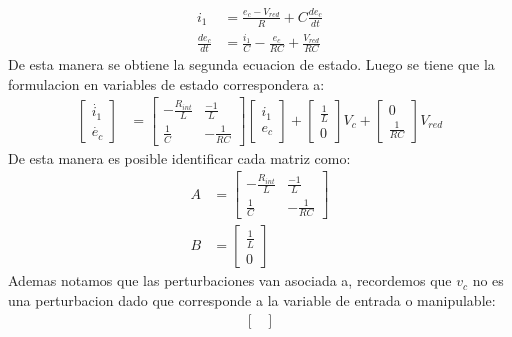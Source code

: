 \documentclass[
  11pt,
  letterpaper,
   addpoints,
   answers
  ]{exam}
\begin{document}
\begin{questions}
\begin{solution}
\begin{align}
        i_{1} &= \frac{e_{c} - V_{red}}{R} + C\frac{de_{c}}{dt}\\
        \frac{de_{c}}{dt} &= \frac{i_{1}}{C} - \frac{e_{c}}{RC}  + \frac{V_{red}}{RC}
    \end{align}
    De esta manera se obtiene la segunda ecuacion de estado. Luego se tiene que la formulacion en variables de estado correspondera a:
    \begin{align}
        \begin{bmatrix}
            \dot{i_{1}}\\
            \dot{e_{c}}
        \end{bmatrix}
        &=
        \begin{bmatrix}
            -\frac{R_{int}}{L} & \frac{-1}{L}\\
            \frac{1}{C} & -\frac{1}{RC}
        \end{bmatrix}
        \begin{bmatrix}
            i_{1}\\
            e_{c}
        \end{bmatrix}
        +
        \begin{bmatrix}
            \frac{1}{L}\\
            0
        \end{bmatrix}
        V_{c}
        +
        \begin{bmatrix}
            0\\
            \frac{1}{RC}
        \end{bmatrix}
        V_{red}
    \end{align}
    De esta manera es posible identificar cada matriz como:
    \begin{align}
        A &=
        \begin{bmatrix}
            -\frac{R_{int}}{L} & \frac{-1}{L}\\
            \frac{1}{C} & -\frac{1}{RC}
        \end{bmatrix}\\
        B &=
        \begin{bmatrix}
            \frac{1}{L}\\
            0
        \end{bmatrix}
    \end{align}
        Ademas notamos que las perturbaciones van asociada a, recordemos que $v_{c}$ no es una perturbacion dado que corresponde a la variable de entrada o manipulable:
        \begin{align}
            \begin{bmatrix}

\end{bmatrix}
\end{align}
\end{solution}
\end{questions}
\end{document}
